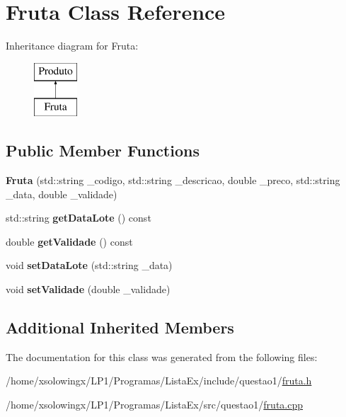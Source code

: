 \hypertarget{classFruta}{}\section{Fruta Class Reference}
\label{classFruta}
Inheritance diagram for Fruta\+:\begin{figure}[H]
\begin{center}
\leavevmode
\includegraphics[height=2.000000cm]{classFruta}
\end{center}
\end{figure}
\subsection*{Public Member Functions}
\begin{DoxyCompactItemize}
\item 
\mbox{\label{classFruta_a2bf2dce96b7094cf9fbb8b90d3516842}} 
{\bfseries Fruta} (std\+::string \+\_\+codigo, std\+::string \+\_\+descricao, double \+\_\+preco, std\+::string \+\_\+data, double \+\_\+validade)
\item 
\mbox{\label{classFruta_a60347bd8c61fe2face180ccde8fa93d0}} 
std\+::string {\bfseries get\+Data\+Lote} () const
\item 
\mbox{\label{classFruta_a6508a7308482bb7c43a21fd187485242}} 
double {\bfseries get\+Validade} () const
\item 
\mbox{\label{classFruta_aa6cc01d8af01018e0a90b91e91884c13}} 
void {\bfseries set\+Data\+Lote} (std\+::string \+\_\+data)
\item 
\mbox{\label{classFruta_a11112ce25fe41bf796a487d818b16406}} 
void {\bfseries set\+Validade} (double \+\_\+validade)
\end{DoxyCompactItemize}
\subsection*{Additional Inherited Members}


The documentation for this class was generated from the following files\+:\begin{DoxyCompactItemize}
\item 
/home/xsolowingx/\+L\+P1/\+Programas/\+Lista\+Ex/include/questao1/\hyperlink{fruta_8h}{fruta.\+h}\item 
/home/xsolowingx/\+L\+P1/\+Programas/\+Lista\+Ex/src/questao1/\hyperlink{fruta_8cpp}{fruta.\+cpp}\end{DoxyCompactItemize}
